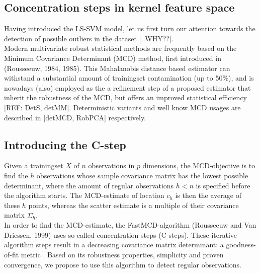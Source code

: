 \documentclass[preprint,12pt]{elsarticle}
\begin{document}
\newpage
\subsection{Concentration steps in kernel feature space}

Having introduced the LS-SVM model, let us first turn our attention towards the detection of possible outliers in the dataset [..WHY??]. \\

Modern multivariate robust statistical methods are frequently based on the Minimum Covariance Determinant (MCD) method, first introduced in  (Rousseeuw, 1984, 1985). This Mahalanobis distance based estimator can withstand a substantial amount of trainingset contamination (up to 50\%), and is nowadays (also) employed as the a refinement step of a proposed estimator that inherit the robustness of the MCD, but offers an improved statistical efficiency [REF: DetS, detMM]. Deterministic variants and well know MCD usages are described in [detMCD, RobPCA] respectively. 

\subsection{Introducing the C-step}

Given a trainingset $X$ of $n$ observations in $p$ dimensions, the MCD-objective is to find the $h$ observations whose sample covariance matrix has the lowest
possible determinant, where the amount of regular observations $h < n$ is specified before the algorithm starts. The MCD-estimate of location $c_h$ is then the average of these $h$ points, whereas the scatter estimate is a multiple of their covariance matrix $\hat{\Sigma}_{h}$. \\
In order to find the MCD-estimate, the FastMCD-algorithm (Rousseeuw and Van Driessen, 1999) uses so-called concentration steps (C-steps). These iterative algorithm steps result in a decreasing covariance matrix determinant: a goodness-of-fit metric . Based on its robustness properties, simplicity and proven convergence, we propose to use this algorithm to detect regular observations.
\end{document}
